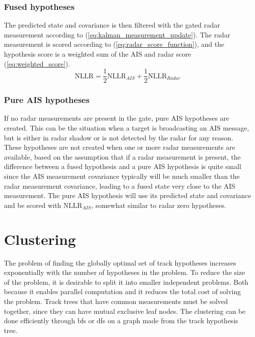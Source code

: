 \subsubsection{Fused hypotheses}
The predicted state and covariance is then filtered with the gated radar measurement according to (\ref{eq:kalman_measurement_update}). The radar measurement is scored according to (\ref{eq:radar_score_function}), and the hypothesis score is a weighted sum of the AIS and radar score (\ref{eq:weighted_score}).
\begin{equation}\label{eq:weighted_score}
\mathrm{NLLR} = \frac{1}{2} \mathrm{NLLR}_{AIS} + \frac{1}{2} \mathrm{NLLR}_{Radar}
\end{equation}

\subsubsection{Pure AIS hypotheses}\label{subsec:pure_ais_hypotheses}
If no radar measurements are present in the gate, pure AIS hypotheses are created. This can be the situation when a target is broadcasting an AIS message, but is either in radar shadow or is not detected by the radar for any reason. These hypotheses are not created when one or more radar measurements are available, based on the assumption that if a radar measurement is present, the difference between a fused hypothesis and a pure AIS hypothesis is quite small since the AIS measurement covariance typically will be much smaller than the radar measurement covariance, leading to a fused state very close to the AIS measurement. The pure AIS hypothesis will use its predicted state and covariance and be  scored with \(\mathrm{NLLR}_{AIS}\), somewhat similar to radar zero hypotheses.

\section{Clustering}
The problem of finding the globally optimal set of track hypotheses increases exponentially with the number of hypotheses in the problem. To reduce the size of the problem, it is desirable to split it into smaller independent problems. Both because it enables parallel computation and it reduces the total cost of solving the problem. Track trees that have common measurements must be solved together, since they can have mutual exclusive leaf nodes. The clustering can be done efficiently through \gls{bfs} or \gls{dfs} on a graph made from the \gls{track hypothesis tree}.


